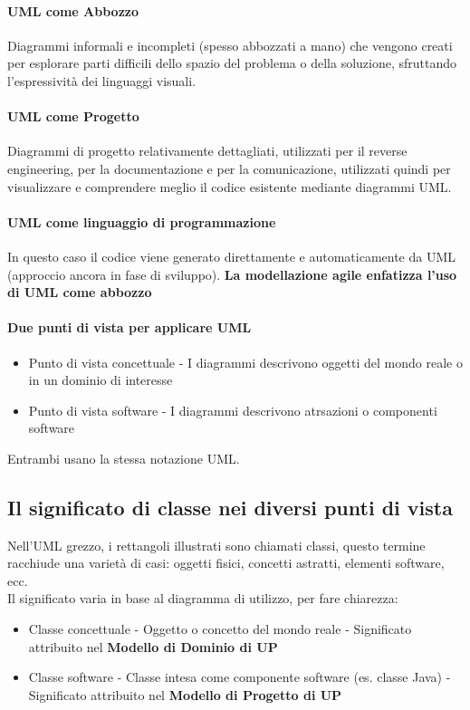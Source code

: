 \paragraph*{UML come Abbozzo} Diagrammi informali e incompleti (spesso abbozzati a mano)
che vengono creati per esplorare parti difficili dello spazio del problema o 
della soluzione, sfruttando l'espressività dei linguaggi visuali.
\paragraph*{UML come Progetto} Diagrammi di progetto relativamente dettagliati,
utilizzati per il reverse engineering, per la documentazione e per la comunicazione,
utilizzati quindi per visualizzare e comprendere meglio il codice esistente mediante
diagrammi UML.
\paragraph*{UML come linguaggio di programmazione} In questo caso il codice
viene generato direttamente e automaticamente da UML (approccio ancora in fase
di sviluppo).
\textbf{La modellazione agile enfatizza l'uso di UML come abbozzo}
\paragraph*{Due punti di vista per applicare UML}
\begin{itemize}
    \item Punto di vista concettuale - I diagrammi descrivono oggetti del mondo reale
    o in un dominio di interesse
    \item Punto di vista software - I diagrammi descrivono atrsazioni o componenti
    software
\end{itemize}
Entrambi usano la stessa notazione UML.
\subsection*{Il significato di classe nei diversi punti di vista}
Nell'UML grezzo, i rettangoli illustrati sono chiamati classi, questo termine
racchiude una varietà di casi: oggetti fisici, concetti astratti, elementi software, ecc.
\\ Il significato varia in base al diagramma di utilizzo, per fare chiarezza:
\begin{itemize}
    \item Classe concettuale - Oggetto o concetto del mondo reale - Significato
    attribuito nel \textbf{Modello di Dominio di UP}
    \item Classe software - Classe intesa come componente software (es. classe Java)
    - Significato attribuito nel \textbf{Modello di Progetto di UP}
\end{itemize}

